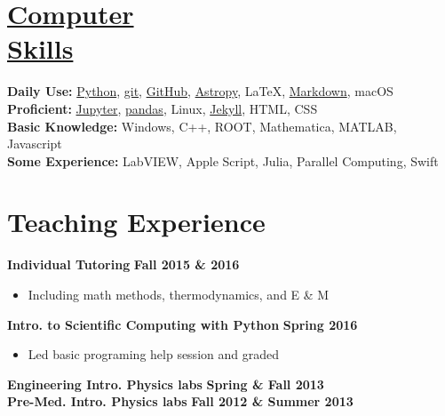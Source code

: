 \documentclass[margin]{res}
\begin{document}
\begin{resume}
\section{\href{https://github.com/benjaminrose}{Computer \\Skills}}
{\bf Daily Use:} \href{https://www.python.org}{Python}, \href{https://git-scm.com}{git}, \href{https://github.com/benjaminrose}{GitHub}, \href{http://www.astropy.org}{Astropy}, \LaTeX, \href{http://daringfireball.net/projects/markdown/}{Markdown}, macOS \\
{\bf Proficient:} \href{http://jupyter.org}{Jupyter}, \href{http://pandas.pydata.org}{pandas}, Linux, \href{https://jekyllrb.com}{Jekyll}, HTML, CSS \\
{\bf Basic Knowledge:} Windows, C++, ROOT, Mathematica, MATLAB, Javascript\\
{\bf Some Experience:} LabVIEW, Apple Script, Julia, Parallel Computing, Swift







\section{Teaching Experience}
\textbf{Individual Tutoring} \hfill{} \textbf{Fall 2015 \& 2016}
    \begin{itemize}\itemsep -2pt
    \item[] Including math methods, thermodynamics, and E \& M
    \end{itemize} \vspace{-10pt}
\textbf{Intro. to Scientific Computing with Python} \hfill{} \textbf{Spring 2016}
    \begin{itemize}\itemsep -2pt
    \item[] Led basic programing help session and graded
    \end{itemize} \vspace{-10pt}
\textbf{Engineering Intro. Physics labs} \hfill{} \textbf{Spring \& Fall 2013} \\
\textbf{Pre-Med. Intro. Physics labs} \hfill{} \textbf{Fall 2012 \& Summer 2013}










\end{resume}
\end{document}
